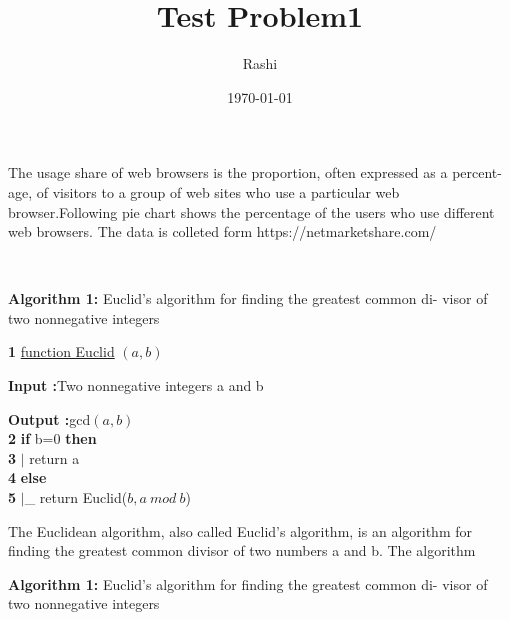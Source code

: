 \documentclass{article}
\begin{document}
	\title{Test Problem1}
	\author{Rashi}
	\date{\today}
	\maketitle
	The usage share of web browsers is the proportion, often expressed as a percent-
	age, of visitors to a group of web sites who use a particular web browser.Following
	pie chart shows the percentage of the users who use different web browsers. The
	data is colleted form https://netmarketshare.com/

	\\
	
	\noindent\hrulefill 
	
	\normalsize
	\textbf{Algorithm 1: }Euclid’s algorithm for finding the greatest common di-
	visor of two nonnegative integers
				
	\noindent\hrulefill 
	
	\normalsize 
	 \noindent\textbf{1}\hspace{0.25cm}   \underline{function Euclid} $(a,b)$
	  
	\textbf{Input :}Two nonnegative integers a and b
	 
	 \textbf{Output :}gcd$(a,b)$\\
	\textbf{2}\hspace{0.25cm}   \textbf{if }b=0 \textbf{then}\\
	\textbf{3}\hspace{0.25cm}   \textbf{$\mid$} return a\\
	\textbf{4}\hspace{0.25cm}   \textbf{else}\\
	\textbf{5}\hspace{0.25cm}   \textbf{$\mid$}\_ return Euclid($b,a\ mod\ b$)
			
\noindent\hrulefill 

\normalsize
The Euclidean algorithm, also called Euclid’s algorithm, is an algorithm for
finding the greatest common divisor of two numbers a and b. The algorithm\\
\vspace{5cm}

\noindent\hrulefill 

\normalsize
\label{algo}
\textbf{Algorithm 1: }Euclid’s algorithm for finding the greatest common di-
visor of two nonnegative integers
\end{document}

